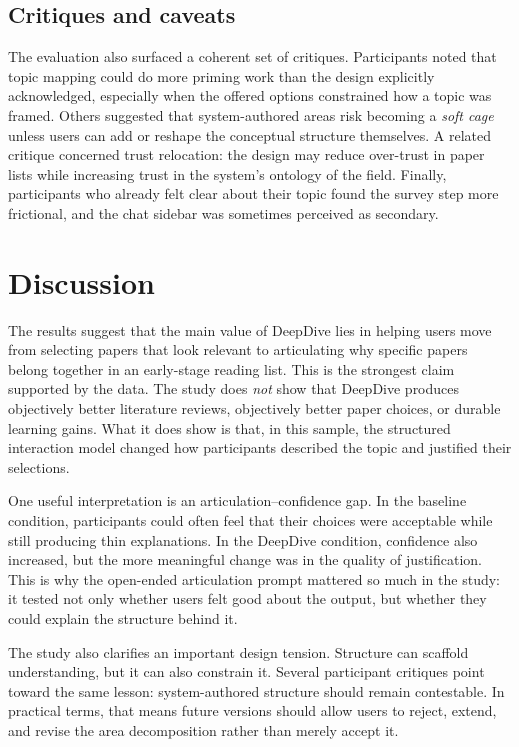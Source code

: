 \documentclass[manuscript,screen]{acmart}
\begin{document}
\subsection{Critiques and caveats}
The evaluation also surfaced a coherent set of critiques. Participants noted that topic mapping could do more priming work than the design explicitly acknowledged, especially when the offered options constrained how a topic was framed. Others suggested that system-authored areas risk becoming a \textit{soft cage} unless users can add or reshape the conceptual structure themselves. A related critique concerned trust relocation: the design may reduce over-trust in paper lists while increasing trust in the system's ontology of the field. Finally, participants who already felt clear about their topic found the survey step more frictional, and the chat sidebar was sometimes perceived as secondary.

\section{Discussion}
The results suggest that the main value of DeepDive lies in helping users move from selecting papers that look relevant to articulating why specific papers belong together in an early-stage reading list. This is the strongest claim supported by the data. The study does \emph{not} show that DeepDive produces objectively better literature reviews, objectively better paper choices, or durable learning gains. What it does show is that, in this sample, the structured interaction model changed how participants described the topic and justified their selections.

One useful interpretation is an articulation--confidence gap. In the baseline condition, participants could often feel that their choices were acceptable while still producing thin explanations. In the DeepDive condition, confidence also increased, but the more meaningful change was in the quality of justification. This is why the open-ended articulation prompt mattered so much in the study: it tested not only whether users felt good about the output, but whether they could explain the structure behind it.

The study also clarifies an important design tension. Structure can scaffold understanding, but it can also constrain it. Several participant critiques point toward the same lesson: system-authored structure should remain contestable. In practical terms, that means future versions should allow users to reject, extend, and revise the area decomposition rather than merely accept it.
\end{document}
